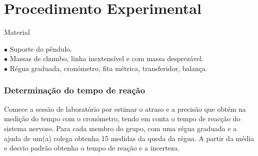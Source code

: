 \documentclass[a4paper,12pt]{article}      %
\begin{document}
\newpage


\section*{\sf Procedimento Experimental}
{ \large Material }
 \begin{flushleft}
	 $\bullet$ Suporte do pêndulo. \\
	 $\bullet$ Massas de chumbo, linha inextensível e com massa desprezável. \\
	 $\bullet$ Régua graduada, cronómetro, fita métrica, transferidor, balança.
\end{flushleft} 

\subsubsection*{\sf Determinação do tempo de reação}
Comece a sessão de laboratório por estimar o atraso e a precisão que obtém na medição do tempo com o cronómetro, tendo em conta o tempo de reacção do sistema nervoso. 
Para cada membro do grupo, com  uma régua graduada e a ajuda de um(a) colega obtenha 15 medidas da queda da régua. A partir da média e desvio padrão obtenha o  tempo de reação  e a incerteza. 


\end{document}
